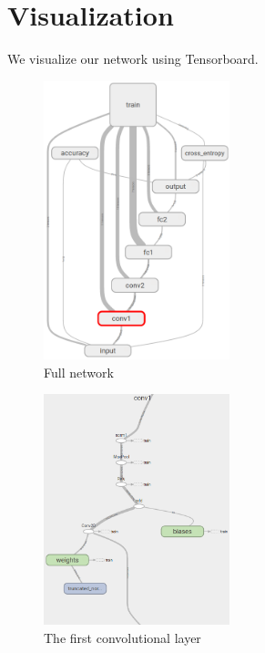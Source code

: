 \documentclass[twoside, twocolumn]{article}
\begin{document}

\section{Visualization}

We visualize our network using Tensorboard.

\begin{figure}[htb]
\centering
	\includegraphics[width=0.48\textwidth]{network.png}
	\caption{Full network}
\end{figure}

\begin{figure}[htb]
\centering
	\includegraphics[width=0.48\textwidth]{conv_layer.png}
	\caption{The first convolutional layer}
\end{figure}
\end{document}

